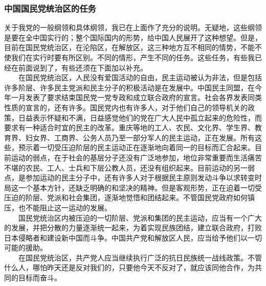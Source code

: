 \documentclass[cn,11pt,chinese]{elegantbook}
\def\myformat#1{\hfil\hfil #1}
\begin{document}
\subsubsection*{\myformat{中国国民党统治区的任务}}
关于我党的一般纲领和具体纲领，我已在上面作了充分的说明。无疑地，这些纲领是要在全中国实行的；整个国际国内的形势，给中国人民展开了这种想望。但是，目前在国民党统治区，在沦陷区，在解放区，这三种地方互不相同的情势，不能不使我们在实行时要有所区别。不同的情形，产生不同的任务。这些任务，有些我已经在前面说到了，有些还须在下面加以补充。\\
　　在国民党统治区，人民没有爱国活动的自由，民主运动被认为非法，但是包括许多阶层、许多民主党派和民主分子的积极活动是在发展中。中国民主同盟，在今年一月发表了要求结束国民党一党专政和成立联合政府的宣言。社会各界发表同类性质的宣言的，还有许多。国民党内也有许多人，对于他们自己的领导机关的政策，日益表示怀疑和不满，日益感觉他们的党在广大人民中孤立起来的危险性，而要求有一种适合时宜的民主的改革。重庆等地的工人、农民、文化界、学生界、教育界、妇女界、工商界、公务人员乃至一部分军人的民主运动，正在发展。所有这些，预示着一切受压迫阶层的民主运动正在逐渐地向着同一的目标而汇合起来。目前运动的弱点，在于社会的基层分子还没有广泛地参加，地位非常重要而生活痛苦不堪的农民、工人、士兵和下层公教人员，还没有组织起来。目前运动的另一弱点，是参加运动的民主分子中，还有许多人对于根据民主原则发动斗争以求转变时局这一个基本方针，还缺乏明确的和坚决的精神。但是客观形势，正在迫着一切受压迫的阶层、党派和社会集团，逐渐地觉悟和团结起来。不管国民党政府如何镇压，也不能阻止这一运动的发展。\\
　　国民党统治区内被压迫的一切阶层、党派和集团的民主运动，应当有一个广大的发展，并把分散的力量逐渐统一起来，为着实现民族团结，建立联合政府，打败日本侵略者和建设新中国而斗争。中国共产党和解放区人民，应当给予他们以一切可能的援助。\\
　　在国民党统治区，共产党人应当继续执行广泛的抗日民族统一战线政策。不管什么人，哪怕昨天还是反对我们的，只要他今天不反对了，就应该同他合作，为共同的目标而奋斗。\\
\end{document}
